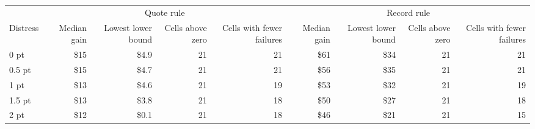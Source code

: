 \begin{tabular}{lrrrrrrrr}
\toprule
 & \multicolumn{4}{c}{Quote rule} & \multicolumn{4}{c}{Record rule} \\
Distress & Median gain & Lowest lower bound & Cells above zero & Cells with fewer failures & Median gain & Lowest lower bound & Cells above zero & Cells with fewer failures \\
\midrule
0 pt & \$15 & \$4.9 & 21 & 21 & \$61 & \$34 & 21 & 21 \\
0.5 pt & \$15 & \$4.7 & 21 & 21 & \$56 & \$35 & 21 & 21 \\
1 pt & \$13 & \$4.6 & 21 & 19 & \$53 & \$32 & 21 & 19 \\
1.5 pt & \$13 & \$3.8 & 21 & 18 & \$50 & \$27 & 21 & 18 \\
2 pt & \$12 & \$0.1 & 21 & 18 & \$46 & \$21 & 21 & 15 \\
\bottomrule
\end{tabular}
